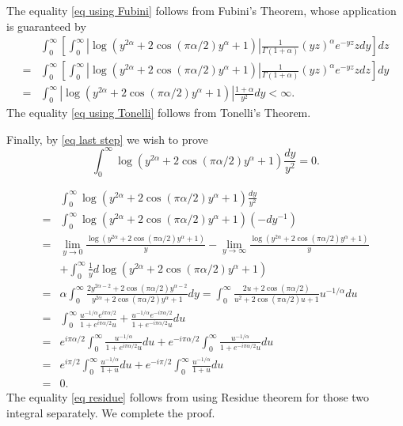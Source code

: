 \documentclass[12pt]{amsart}
\begin{document}
The equality \eqref{eq using Fubini} follows from Fubini's Theorem, whose application is guaranteed by
\begin{align}
    &  \int_0^\infty \left[ \int_0^\infty | \log (y^{2\alpha} + 2\cos(\pi \alpha/2)y^\alpha + 1)| \frac{1}{\Gamma(1+\alpha) }(yz)^\alpha e^{-yz} zdy \right] dz  \\
    \label{eq using Tonelli}
    = &  \int_0^\infty \left[ \int_0^\infty | \log (y^{2\alpha} + 2\cos(\pi \alpha/2)y^\alpha + 1)| \frac{1}{\Gamma(1+\alpha) }(yz)^\alpha e^{-yz} zdz \right] dy \\
    = &   \int_0^\infty  |\log (y^{2\alpha} + 2\cos(\pi \alpha/2)y^\alpha + 1)| \frac{1+\alpha}{y^2}  dy  < \infty. 
\end{align}
The equality \eqref{eq using Tonelli} follows from Tonelli's Theorem. 

Finally, by \eqref{eq last step} we wish to prove 
\begin{equation}
     \int_0^\infty  \log (y^{2\alpha} + 2\cos(\pi \alpha/2)y^\alpha + 1) \frac{dy}{y^2}   =  0.   
\end{equation}

\begin{align}
   &  \int_0^\infty  \log (y^{2\alpha} + 2\cos(\pi \alpha/2)y^\alpha + 1) \frac{dy}{y^2} \\
   = & \int_0^\infty  \log (y^{2\alpha} + 2\cos(\pi \alpha/2)y^\alpha + 1) (-dy^{-1} ) \\
   = & \lim_{y \rightarrow 0} \frac{ \log (y^{2\alpha} + 2\cos(\pi \alpha/2)y^\alpha + 1)}{y} - \lim_{y \rightarrow \infty} \frac{ \log (y^{2\alpha} + 2\cos(\pi \alpha/2)y^\alpha + 1)}{y} \\
   & + \int_0^\infty \frac{1}{y} d\log (y^{2\alpha} + 2\cos(\pi \alpha/2)y^\alpha + 1) \\
   = & \alpha \int_0^\infty  \frac{ 2y^{2\alpha-2} + 2\cos(\pi \alpha/2) y^{\alpha-2}}{y^{2\alpha} + 2\cos(\pi \alpha/2)y^\alpha + 1}dy = \int_0^\infty  \frac{ 2 u + 2\cos(\pi \alpha/2) }{u^{2} + 2\cos(\pi \alpha/2)u + 1} u^{-1/\alpha} du \\
   = &  \int_0^\infty \frac{u^{-1/\alpha} e^{i\pi \alpha/2} }{1 + e^{i\pi \alpha/2} u }+ \frac{u^{-1/\alpha} e^{- i\pi \alpha/2} }{1 + e^{-i\pi \alpha/2} u }   du   \\
   = &  e^{i\pi \alpha/2} \int_0^\infty \frac{u^{-1/\alpha}  }{1 + e^{i\pi \alpha/2} u }  du  + e^{-i\pi \alpha/2} \int_0^\infty \frac{u^{-1/\alpha}  }{1 + e^{-i\pi \alpha/2} u }  du \\
   \label{eq residue}
   =& e^{i\pi/2} \int_0^\infty \frac{u^{-1/\alpha}  }{1 +  u }  du + e^{-i\pi/2} \int_0^\infty \frac{u^{-1/\alpha}  }{1 +  u }  du \\
   =&  0. 
\end{align}
The equality \eqref{eq residue} follows from using Residue theorem for those two integral separately. We complete the proof. 
\end{document}
